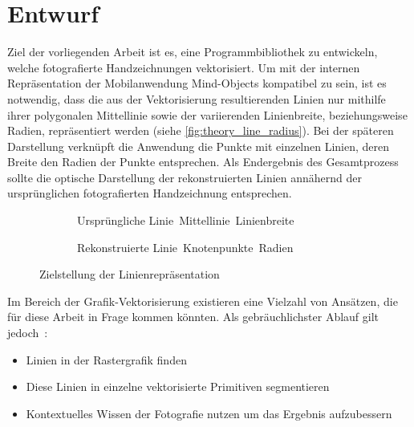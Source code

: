 \chapter{Entwurf}%
\label{cha:theory}

Ziel der vorliegenden Arbeit ist es, eine Programmbibliothek zu entwickeln, welche fotografierte Handzeichnungen vektorisiert.
Um mit der internen Repräsentation der Mobilanwendung Mind-Objects kompatibel zu sein, ist es notwendig, dass die aus der Vektorisierung resultierenden Linien nur mithilfe ihrer polygonalen Mittellinie sowie der variierenden Linienbreite, beziehungsweise Radien, repräsentiert werden (siehe \autoref{fig:theory_line_radius}).
Bei der späteren Darstellung verknüpft die Anwendung die Punkte mit einzelnen Linien, deren Breite den Radien der Punkte entsprechen.
Als Endergebnis des Gesamtprozess sollte die optische Darstellung der rekonstruierten Linien annähernd der ursprünglichen fotografierten Handzeichnung entsprechen.

\begin{figure}[h]
    \centering
    \begin{subfigure}[t]{0.45\textwidth}
        
        \caption{\textcolor{gray}{}~Ursprüngliche Linie\enskip{}~Mittellinie\enskip{}~Linienbreite}
    \end{subfigure}
    \hfill
    \begin{subfigure}[t]{0.45\textwidth}
        
        \caption{\textcolor{gray}{}~Rekonstruierte Linie\enskip{}~Knotenpunkte\enskip{}~Radien}
    \end{subfigure}
    \caption{Zielstellung der Linienrepräsentation}%
    \label{fig:theory_line_radius}
\end{figure}

Im Bereich der Grafik-Vektorisierung existieren eine Vielzahl von Ansätzen, die für diese Arbeit in Frage kommen könnten.
Als gebräuchlichster Ablauf gilt jedoch~\cite{DBLP:journals/pami/HilaireT06,DBLP:conf/grec/TombreADMT99}:
\begin{itemize}
    \item Linien in der Rastergrafik finden
    \item Diese Linien in einzelne vektorisierte Primitiven segmentieren
    \item Kontextuelles Wissen der Fotografie nutzen um das Ergebnis aufzubessern
\end{itemize}

